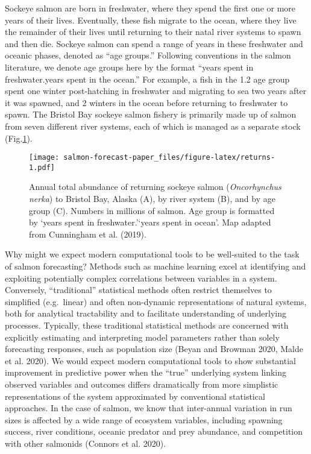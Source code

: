 \documentclass[
]{article}
\begin{document}
Sockeye salmon are born in freshwater, where they spend the first one or more years of their lives. Eventually, these fish migrate to the ocean, where they live the remainder of their lives until returning to their natal river systems to spawn and then die. Sockeye salmon can spend a range of years in these freshwater and oceanic phases, denoted as ``age groups.'' Following conventions in the salmon literature, we denote age groups here by the format ``years spent in freshwater.years spent in the ocean.'' For example, a fish in the 1.2 age group spent one winter post-hatching in freshwater and migrating to sea two years after it was spawned, and 2 winters in the ocean before returning to freshwater to spawn. The Bristol Bay sockeye salmon fishery is primarily made up of salmon from seven different river systems, each of which is managed as a separate stock (Fig.\ref{fig:returns}).

\begin{figure}
\centering
\texttt{[image: salmon-forecast-paper\_files/figure-latex/returns-1.pdf]}
\caption{\label{fig:returns}Annual total abundance of returning sockeye salmon (\emph{Oncorhynchus nerka}) to Bristol Bay, Alaska (A), by river system (B), and by age group (C). Numbers in millions of salmon. Age group is formatted by `years spent in freshwater.'`years spent in ocean'. Map adapted from Cunningham et al. (2019).}
\end{figure}

Why might we expect modern computational tools to be well-suited to the task of salmon forecasting? Methods such as machine learning excel at identifying and exploiting potentially complex correlations between variables in a system. Conversely, ``traditional'' statistical methods often restrict themselves to simplified (e.g.~linear) and often non-dynamic representations of natural systems, both for analytical tractability and to facilitate understanding of underlying processes. Typically, these traditional statistical methods are concerned with explicitly estimating and interpreting model parameters rather than solely forecasting responses, such as population size (Beyan and Browman 2020, Malde et al. 2020). We would expect modern computational tools to show substantial improvement in predictive power when the ``true'' underlying system linking observed variables and outcomes differs dramatically from more simplistic representations of the system approximated by conventional statistical approaches. In the case of salmon, we know that inter-annual variation in run sizes is affected by a wide range of ecosystem variables, including spawning success, river conditions, oceanic predator and prey abundance, and competition with other salmonids (Connors et al. 2020).
\end{document}
